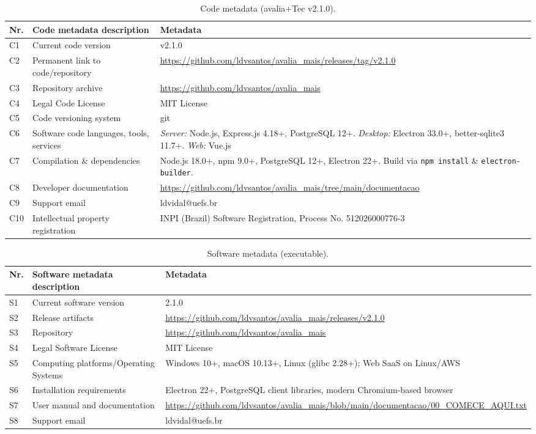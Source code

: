 \documentclass[preprint,12pt,a4paper]{elsarticle}
\begin{document}
\begin{table}[!h]
\begin{tabular}{|l|p{6.5cm}|p{6.5cm}|}
\hline
\textbf{Nr.} & \textbf{Code metadata description} & \textbf{Metadata} \\
\hline
C1 & Current code version & v2.1.0 \\
\hline
C2 & Permanent link to code/repository & \url{https://github.com/ldvsantos/avalia_mais/releases/tag/v2.1.0} \\
\hline
C3 & Repository archive & \url{https://github.com/ldvsantos/avalia_mais} \\
\hline
C4 & Legal Code License & MIT License \\
\hline
C5 & Code versioning system & git \\
\hline
C6 & Software code languages, tools, services & \textit{Server:} Node.js, Express.js 4.18+, PostgreSQL 12+. \textit{Desktop:} Electron 33.0+, better-sqlite3 11.7+. \textit{Web:} Vue.js \\
\hline
C7 & Compilation \& dependencies & Node.js 18.0+, npm 9.0+, PostgreSQL 12+, Electron 22+. Build via \texttt{npm install} \& \texttt{electron-builder}. \\
\hline
C8 & Developer documentation & \url{https://github.com/ldvsantos/avalia_mais/tree/main/documentacao} \\
\hline
C9 & Support email & ldvidal@uefs.br \\
\hline
C10 & Intellectual property registration & INPI (Brazil) Software Registration, Process No. 512026000776-3 \\
\hline
\end{tabular}
\caption{Code metadata (avalia+Tec v2.1.0).}
\label{codeMetadata}
\end{table}

\begin{table}[!h]
\begin{tabular}{|l|p{6.5cm}|p{6.5cm}|}
\hline
\textbf{Nr.} & \textbf{Software metadata description} & \textbf{Metadata} \\
\hline
S1 & Current software version & 2.1.0 \\
\hline
S2 & Release artifacts & \url{https://github.com/ldvsantos/avalia_mais/releases/v2.1.0} \\
\hline
S3 & Repository & \url{https://github.com/ldvsantos/avalia_mais} \\
\hline
S4 & Legal Software License & MIT License \\
\hline
S5 & Computing platforms/Operating Systems & Windows 10+, macOS 10.13+, Linux (glibc 2.28+); Web SaaS on Linux/AWS \\
\hline
S6 & Installation requirements & Electron 22+, PostgreSQL client libraries, modern Chromium-based browser \\
\hline
S7 & User manual and documentation & \url{https://github.com/ldvsantos/avalia_mais/blob/main/documentacao/00_COMECE_AQUI.txt} \\
\hline
S8 & Support email & ldvidal@uefs.br \\
\hline
\end{tabular}
\caption{Software metadata (executable).}
\label{executableMetadata}
\end{table}
\end{document}
